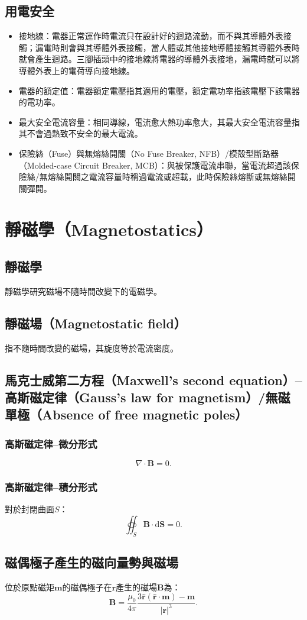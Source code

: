 \documentclass[a4paper,12pt]{report}
\begin{document}
\begin{itemize}
\subsection{用電安全}
\begin{itemize}
\item 接地線：電器正常運作時電流只在設計好的迴路流動，而不與其導體外表接觸；漏電時則會與其導體外表接觸，當人體或其他接地導體接觸其導體外表時就會產生迴路。三腳插頭中的接地線將電器的導體外表接地，漏電時就可以將導體外表上的電荷導向接地線。
\item 電器的額定值：電器額定電壓指其適用的電壓，額定電功率指該電壓下該電器的電功率。
\item 最大安全電流容量：相同導線，電流愈大熱功率愈大，其最大安全電流容量指其不會過熱致不安全的最大電流。
\item 保險絲（Fuse）與無熔絲開關（No Fuse Breaker, NFB）/模殼型斷路器（Molded-case Circuit Breaker, MCB）：與被保護電流串聯，當電流超過該保險絲/無熔絲開關之電流容量時稱過電流或超載，此時保險絲熔斷或無熔絲開關彈開。
\end{itemize}


\section{靜磁學（Magnetostatics）}
\subsection{靜磁學}
靜磁學研究磁場不隨時間改變下的電磁學。
\subsection{靜磁場（Magnetostatic field）}
指不隨時間改變的磁場，其旋度等於電流密度。
\subsection{馬克士威第二方程（Maxwell's second equation）–高斯磁定律（Gauss's law for magnetism）/無磁單極（Absence of free magnetic poles）}
\subsubsection{高斯磁定律–微分形式}
\[\nabla \cdot \mathbf{B} = 0.\]
\subsubsection{高斯磁定律–積分形式}
對於封閉曲面$S$：
\[\oiint_S\mathbf{B}\cdot\mathrm{d}\mathbf{S}=0.\]
\subsection{磁偶極子產生的磁向量勢與磁場}
位於原點磁矩$\mathbf{m}$的磁偶極子在$\mathbf{r}$產生的磁場$\mathbf{B}$為：
\[\mathbf{B}=\frac{\mu_0}{4\pi}\frac{3\hat{\mathbf{r}}\left(\hat{\mathbf{r}}\cdot\mathbf{m}\right)-\mathbf{m}}{|\mathbf{r}|^3}.\]

\end{itemize}
\end{document}
